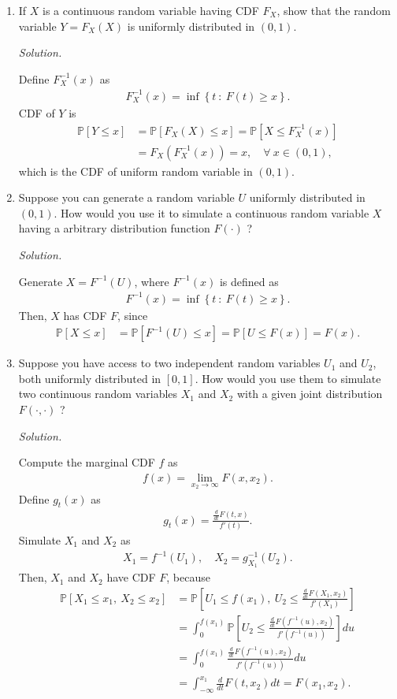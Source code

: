 \documentclass{article}
\begin{document}
\begin{enumerate}
\item If $X$ is a continuous random variable having CDF $F_X$, show that the random variable $Y=F_X(X)$ is uniformly distributed in $(0,1)$.

\emph{Solution.}

Define $F_X^{-1}(x)$ as
	\begin{align*}
	F_X^{-1}(x)=\inf\left\{t~:~F(t)\geq x\right\}.	
	\end{align*}
CDF of $Y$ is
	\begin{align*}
	\mathbb{P}[Y\leq x]&=\mathbb{P}[F_X(X)\leq x]=\mathbb{P} \left[X\leq F_X^{-1}(x)\right]\\ 	&=F_X\left(F_X^{-1}(x)\right)=x,\quad\forall~x\in(0,1),
	\end{align*}
which is the CDF of uniform random variable in $(0,1)$.

\item Suppose you can generate a random variable $U$ uniformly distributed in $(0,1)$. How would you use it to simulate a continuous random variable $X$ having a arbitrary distribution function $F(\cdot)$ ? 

\emph{Solution.}

Generate $X=F^{-1}(U)$, where $F^{-1}(x)$ is defined as
	\begin{align*}
	F^{-1}(x)=\inf\left\{t~:~F(t)\geq x\right\}.	
	\end{align*}
Then, $X$ has CDF $F$, since
	\begin{align*}
	\mathbb{P}[X\leq x]&=\mathbb{P}\left[F^{-1}(U)\leq x\right]=\mathbb{P}[U\leq F(x)]=F(x).	
	\end{align*}

\item  Suppose you have access to two independent random variables $U_1$ and $U_2$, both uniformly distributed in $[0,1]$.
How would you use them to simulate two continuous random variables $X_1$ and $X_2$ with a given joint distribution $F(\cdot,\cdot)$ ?

\emph{Solution.}

Compute the marginal CDF $f$ as
	\begin{align*}
	f(x)=\lim_{x_2\rightarrow\infty} F(x,x_2).
	\end{align*}
Define $g_t(x)$ as
	\begin{align*}
	g_t(x)=\frac{\frac{d}{dt}F(t,x)}{f'(t)}.	
	\end{align*}
Simulate $X_1$ and $X_2$ as 
	\begin{align*}
	X_1=f^{-1}(U_1),\quad X_2=g_{X_1}^{-1}(U_2).	
	\end{align*}
Then, $X_1$ and $X_2$ have CDF $F$, because
	\begin{align*}
	\mathbb{P}[X_1\leq x_1,~X_2\leq x_2]&=\mathbb{P}\left[ U_1\leq f(x_1), ~U_2\leq \frac{\frac{d}{dt}F(X_1,x_2)}{f'(X_1)}\right]\\
	&=\int_0^{f(x_1)} \mathbb{P}\left[ U_2\leq \frac{\frac{d}{dt}F(f^{-1}(u),x_2)}{f'(f^{-1}(u))}\right]du\\
	&=\int_0^{f(x_1)} \frac{\frac{d}{dt}F(f^{-1}(u),x_2)}{f'(f^{-1}(u))}du\\
	&=\int_{-\infty}^{x_1} \frac{d}{dt}F(t,x_2) dt=F(x_1,x_2).
	\end{align*}


\end{enumerate}
\end{document}
